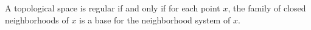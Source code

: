 A topological space is regular if and only if for each point $x$, the family of closed neighborhoods of $x$ is a base for the neighborhood system of $x$.
